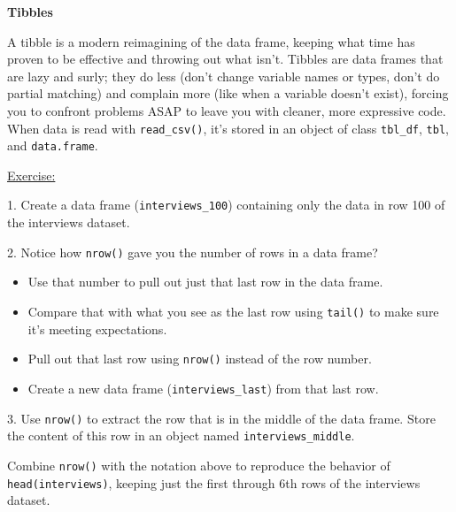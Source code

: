 \documentclass[12pt]{article}
\begin{document}
\textbf{Tibbles}

A tibble is a modern reimagining of the data frame, keeping what time has proven to be effective and throwing out what isn't. Tibbles are data frames that are lazy and surly; they do less (don't change variable names or types, don't do partial matching) and complain more (like when a variable doesn't exist), forcing you to confront problems ASAP to leave you with cleaner, more expressive code. When data is read with \texttt{read\_csv()}, it's stored in an object of class \texttt{tbl\_df}, \texttt{tbl}, and \texttt{data.frame}.

\vspace{0.5em}
\begin{addmargin}[1cm]{0cm}
\color{gray}
\underline{Exercise:}

1. Create a data frame (\texttt{interviews\_100}) containing only the data in row 100 of the interviews dataset.

2. Notice how \texttt{nrow()} gave you the number of rows in a data frame?

\begin{itemize}
    \item Use that number to pull out just that last row in the data frame.
    \item Compare that with what you see as the last row using \texttt{tail()} to make sure it’s meeting expectations.
    \item Pull out that last row using \texttt{nrow()} instead of the row number.
    \item Create a new data frame (\texttt{interviews\_last}) from that last row.
\end{itemize}

3. Use \texttt{nrow()} to extract the row that is in the middle of the data frame. Store the content of this row in an object named \texttt{interviews\_middle}.

Combine \texttt{nrow()} with the \texttt{\-} notation above to reproduce the behavior of \texttt{head(interviews)}, keeping just the first through 6th rows of the interviews dataset.
\end{addmargin}

\color{black}\vspace{0.5em}
\end{document}
